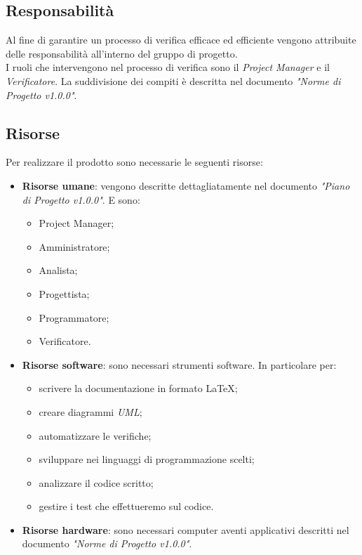 \documentclass[12pt,a4paper,titlepage]{article}
\begin{document}
	\subsection{Responsabilità}
	Al fine di garantire un processo di verifica efficace ed efficiente vengono attribuite delle responsabilità all'interno del gruppo di progetto.\\
	I ruoli che intervengono nel processo di verifica sono il \textit{Project Manager} e il \textit{Verificatore}. La suddivisione dei compiti è descritta nel documento \textit{"Norme di Progetto v1.0.0"}.
	
	\subsection{Risorse}
	Per realizzare il prodotto sono necessarie le seguenti risorse:
	\begin{itemize}
		\item \textbf{Risorse umane}: vengono descritte dettagliatamente nel documento \textit{"Piano di Progetto v1.0.0"}. E sono:
		\begin{itemize}
			\item Project Manager;
			\item Amministratore;
			\item Analista;
			\item Progettista;
			\item Programmatore;
			\item Verificatore.
		\end{itemize}
		\item \textbf{Risorse software}: sono necessari strumenti software. In particolare per:
		\begin{itemize}
			\item scrivere la documentazione in formato \LaTeX;
			\item creare diagrammi \textit{UML};
			\item automatizzare le verifiche;
			\item sviluppare nei linguaggi di programmazione scelti;
			\item analizzare il codice scritto;
			\item gestire i test che effettueremo sul codice.
		\end{itemize}
		\item \textbf{Risorse hardware}: sono necessari computer aventi applicativi descritti nel documento \textit{"Norme di Progetto v1.0.0"}. 
	\end{itemize}
\end{document}

